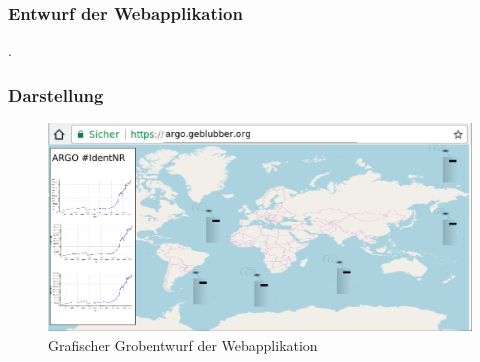 \subsubsection{Entwurf der Webapplikation}
.

\subsubsection{Darstellung}
%
%


\begin{figure}[h!]
    \centering
    \includegraphics[width=\textwidth]{pix/EntwurfWebseite.png}
    \caption{Grafischer Grobentwurf der Webapplikation}
    \label{fig:entwurf_webseite}
\end{figure}

